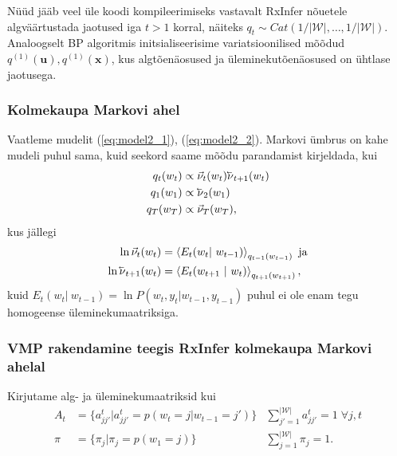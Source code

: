 Nüüd jääb veel üle koodi kompileerimiseks vastavalt RxInfer nõuetele algväärtustada jaotused iga $t > 1$ korral, näiteks $q_t \sim Cat(1/|\mathcal{W}|,\ldots,1/|\mathcal{W}|)$. Analoogselt BP algoritmis initsialiseerisime variatsioonilised mõõdud $q^{(1)}(\bm{u}), q^{(1)}(\bm{x})$, kus algtõenäosused ja üleminekutõenäosused on ühtlase jaotusega.

\subsubsection{Kolmekaupa Markovi ahel}

Vaatleme mudelit (\ref{eq:model2_1}), (\ref{eq:model2_2}). Markovi ümbrus on kahe mudeli puhul sama, kuid seekord saame mõõdu parandamist kirjeldada, kui 
\begin{align*}
    q_t(w_t) &\propto \vec{\nu}_{t}(w_t) \cev{\nu}_{t+1}(w_t)\\
    q_1(w_1) &\propto \cev{\nu}_{2}(w_1)\\
    q_T(w_T) &\propto \vec{\nu}_{T}(w_{T}),
\end{align*}
kus jällegi
\begin{align*}
    \ln \vec{\nu}_{t}(w_t) &= \left< E_t(w_t |\ w_{t-1}) \right>_{q_{t-1}(w_{t-1})} \text{ ja}\\
    \ln \cev{\nu}_{t+1}(w_t) &= \left< E_t(w_{t+1}\ |\ w_t) \right>_{q_{t+1}(w_{t+1})},
\end{align*}
kuid $E_t(w_t |\ w_{t-1}) = \ln P(w_t, y_t | w_{t-1},y_{t-1})$ puhul ei ole enam tegu homogeense üleminekumaatriksiga.

\subsubsection{VMP rakendamine teegis RxInfer kolmekaupa Markovi ahelal} 

Kirjutame alg- ja üleminekumaatriksid kui
\begin{align*}
   A_t &= \{a^t_{jj'} | a^t_{jj'} = p(w_t = j | w_{t-1} = j')\} &\sum_{j'=1}^{|\mathcal{W}|} a^t_{jj'} = 1 \; \forall j, t\\
    \pi &= \{ \pi_j | \pi_j = p(w_1 = j) \} &\sum_{j=1}^{|\mathcal{W}|} \pi_{j} = 1.
\end{align*}

